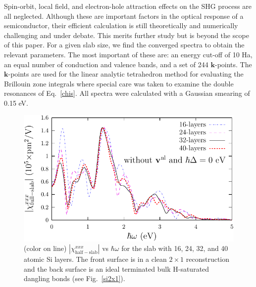 \documentclass[floatfix,prb,aps,superscriptaddress,showpacs,11pt,preprint,letterpaper]{revtex4}
\begin{document}
Spin-orbit, local field, and electron-hole 
attraction\cite{beyond}
effects on the SHG process are all neglected.
Although these are important factors in the optical response of a semiconductor,
their efficient calculation is still theoretically and  
numerically challenging and  
under debate. This merits further study but is beyond the scope of this paper.
For a given slab size, we find the converged spectra 
to obtain the relevant parameters. The most important of 
these are: an energy cut-off of 10 Ha, an equal number of conduction and 
valence bands, and a set of 244 $\mathbf{k}$-points.
The $\mathbf{k}$-points are used for the linear analytic 
tetrahedron method for evaluating the
Brillouin zone integrals 
where special care was taken to examine the double resonances
of Eq.~\eqref{chis}. \cite{nastosPRB05}
All spectra were calculated with a Gaussian smearing of 0.15 eV.
\begin{figure}
\centering 
\includegraphics[scale=.8]{fig3}
\caption{(color on line) 
$|\chi_{\mathrm{half-slab}}^{xxx}|$ vs $\hbar\omega$ 
for the slab
with 16, 24, 32, and 40 atomic Si layers. The front surface 
is in a clean $2\times 1$ reconstruction and the back 
surface is an ideal terminated bulk H-saturated dangling bonds (see Fig.~\ref{si2x1}).
\label{fig1}} 
\end{figure}
\end{document}
